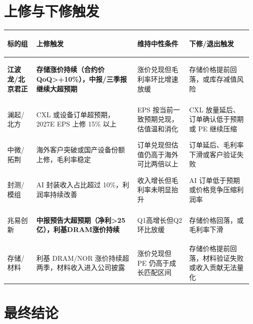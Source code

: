 
\section{上修与下修触发}

\begin{exhibitbox}
\centering
\scriptsize
\renewcommand{\arraystretch}{1.22}
\begin{tabularx}{\exhibitboxwidth}{>{\bfseries\raggedright\arraybackslash}p{1.55cm} >{\raggedright\arraybackslash}X >{\raggedright\arraybackslash}X >{\raggedright\arraybackslash}X}
\toprule
\textbf{标的组} & \textbf{上修触发} & \textbf{维持中性条件} & \textbf{下修/退出触发} \\
\midrule
\rowcolor{riskgreen!6}
\textbf{江波龙/北京君正} & \textbf{存储涨价持续（合约价QoQ>+10\%），中报/三季报继续大超预期} & 涨价兑现但毛利率环比增速放缓 & 存储价格提前回落，或库存减值风险 \\
澜起/北方 & CXL 或设备订单超预期，2027E EPS 上修 15\% 以上 & EPS 按当前一致预期兑现，估值温和消化 & CXL 放量延后、订单确认低于预期或 PE 继续压缩 \\
中微/拓荆 & 海外客户突破或国产设备份额上修，毛利率稳定 & 订单兑现但估值仍高于海外可比两倍以上 & 订单延后、毛利率下滑或客户验证失败 \\
封测/模组 & AI 封装收入占比超过 10\%，利润率持续改善 & 收入增长但毛利率未明显抬升 & AI 订单低于预期或价格竞争压缩利润率 \\
兆易创新 & \textbf{中报预告大超预期（净利>25亿），利基DRAM涨价持续} & Q1高增长但Q2环比放缓 & 存储价格回落，或毛利率下滑 \\
存储/材料 & 利基 DRAM/NOR 涨价持续超两季，材料收入进入公司披露 & 涨价兑现但 PE 仍高于成长匹配区间 & 存储价格提前回落，材料验证失败或收入贡献无法量化 \\
\bottomrule
\end{tabularx}
\end{exhibitbox}

\section{最终结论}

